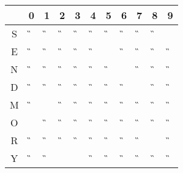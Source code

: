 \begin{tabular}{|c|c|c|c|c|c|c|c|c|c|c|}\hline
  & 0 & 1 & 2 & 3 & 4 & 5 & 6 & 7 & 8 & 9 \\ \hline
S &\G &\G &\G &\G &\G &\G &\G &\G &\G &\A \\ \hline
E &\G &\G &\G &\G &\G &\A &\G &\G &\G &\G \\ \hline
N &\G &\G &\G &\G &\G &\G &\A &\G &\G &\G \\ \hline
D &\G &\G &\G &\G &\G &\G &\G &\A &\G &\G \\ \hline
M &\G &\A &\G &\G &\G &\G &\G &\G &\G &\G \\ \hline
O &\A &\G &\G &\G &\G &\G &\G &\G &\G &\G \\ \hline
R &\G &\G &\G &\G &\G &\G &\G &\G &\A &\G \\ \hline
Y & \G&\G &   &   &\G &\G &\G &\G &\G &\G \\ \hline
\end{tabular}
